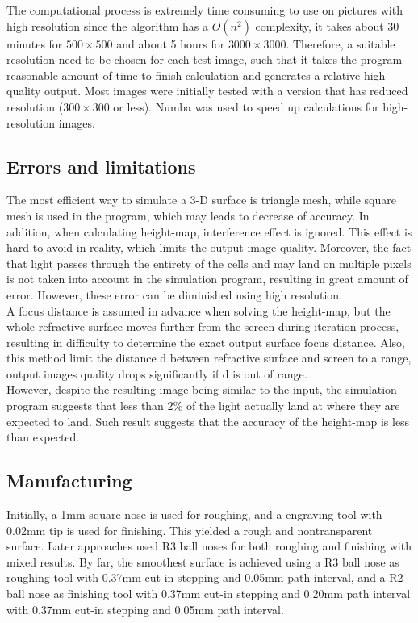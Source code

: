 \documentclass[10pt,two column]{configuration/unoesc}
\begin{document}
The computational process is extremely time consuming to use on pictures with high resolution since the algorithm has a $O(n^2)$ complexity, it takes about 30 minutes for $500 \times 500$ and about 5 hours for $3000 \times 3000$. Therefore, a suitable resolution need to be chosen for each test image, such that it takes the program reasonable amount of time to finish calculation and generates a relative high-quality output. Most images were initially tested with a version that has reduced resolution ($300 \times 300$ or less). Numba was used to speed up calculations for high-resolution images.

\subsection{Errors and limitations}

The most efficient way to simulate a 3-D surface is triangle mesh, while square mesh is used in the program, which may leads to decrease of accuracy. In addition, when calculating height-map, interference effect is ignored. This effect is hard to avoid in reality, which limits the output image quality. Moreover, the fact that light passes through the entirety of the cells and may land on multiple pixels is not taken into account in the simulation program, resulting in great amount of error. However, these error can be diminished using high resolution. \\

A focus distance is assumed in advance when solving the height-map, but the whole refractive surface moves further from the screen during iteration process, resulting in difficulty to determine the exact output surface focus distance. Also, this method limit the distance d between refractive surface and screen to a range, output images quality drops significantly if d is out of range.\\

However, despite the resulting image being similar to the input, the simulation program suggests that less than 2\% of the light actually land at where they are expected to land. Such result suggests that the accuracy of the height-map is less than expected. \\

\subsection{Manufacturing}

Initially, a 1mm square nose is used for roughing, and a engraving tool with 0.02mm tip is used for finishing. This yielded a rough and nontransparent surface. Later approaches used R3 ball noses for both roughing and finishing with mixed results. By far, the smoothest surface is achieved using a R3 ball nose as roughing tool with 0.37mm cut-in stepping and 0.05mm path interval, and a R2 ball nose as finishing tool with 0.37mm cut-in stepping and 0.20mm path interval with 0.37mm cut-in stepping and 0.05mm path interval.\\
\end{document}
